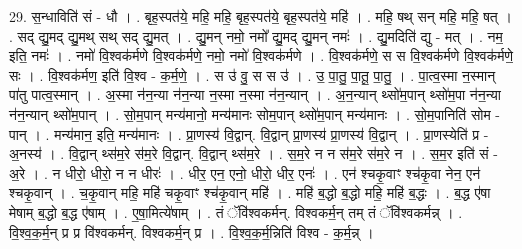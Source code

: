 \documentclass[17pt]{extarticle}
\begin{document}
29. स॒न्धाविति॑ सं - धौ । . बृह॒स्पत॑ये॒ महि॒ महि॒ बृह॒स्पत॑ये॒ बृह॒स्पत॑ये॒ महि॑ । . महि॒ षथ् सन् महि॒ महि॒ षत् । . सद् द्यु॒मद् द्यु॒मथ् सथ् सद् द्यु॒मत् । . द्यु॒मन् नमो॒ नमो᳚ द्यु॒मद् द्यु॒मन् नमः॑ । . द्यु॒मदिति॑ द्यु - मत् । . नम॒ इति॒ नमः॑ । . नमो॑ वि॒श्वक॑र्मणे वि॒श्वक॑र्मणे॒ नमो॒ नमो॑ वि॒श्वक॑र्मणे । . वि॒श्वक॑र्मणे॒ स स वि॒श्वक॑र्मणे वि॒श्वक॑र्मणे॒ सः । . वि॒श्वक॑र्मण॒ इति॑ वि॒श्व - क॒र्म॒णे॒ । . स उ॑ वु॒ स स उ॑ । . उ॒ पा॒तु॒ पा॒तू॒ पा॒तु॒ । . पा॒त्व॒स्मा न॒स्मान् पा॑तु पात्व॒स्मान् । . अ॒स्मा न॑न॒न्या न॑न॒न्या न॒स्मा न॒स्मा न॑न॒न्यान् । . अ॒न॒न्यान् थ्सो॑म॒पान् थ्सो॑म॒पा न॑न॒न्या न॑न॒न्यान् थ्सो॑म॒पान् । . सो॒म॒पान् मन्य॑मानो॒ मन्य॑मानः सोम॒पान् थ्सो॑म॒पान् मन्य॑मानः । . सो॒म॒पानिति॑ सोम - पान् । . मन्य॑मान॒ इति॒ मन्य॑मानः । . प्रा॒णस्य॑ वि॒द्वान्. वि॒द्वान् प्रा॒णस्य॑ प्रा॒णस्य॑ वि॒द्वान् । . प्रा॒णस्येति॑ प्र - अ॒नस्य॑ । . वि॒द्वान् थ्स॑म॒रे स॑म॒रे वि॒द्वान्. वि॒द्वान् थ्स॑म॒रे । . स॒म॒रे न न स॑म॒रे स॑म॒रे न । . स॒म॒र इति॑ सं - अ॒रे । . न धीरो॒ धीरो॒ न न धीरः॑ । . धीर॒ एन॒ एनो॒ धीरो॒ धीर॒ एनः॑ । . एन॑ श्चकृ॒वाꣳ श्च॑कृ॒वा नेन॒ एन॑ श्चकृ॒वान् । . च॒कृ॒वान् महि॒ महि॑ चकृ॒वाꣳ श्च॑कृ॒वान् महि॑ । . महि॑ ब॒द्धो ब॒द्धो महि॒ महि॑ ब॒द्धः । . ब॒द्ध ए॑षा मेषाम् ब॒द्धो ब॒द्ध ए॑षाम् । . ए॒षा॒मित्ये॑षाम् । . तं ॅवि॑श्वकर्मन्. विश्वकर्म॒न् तम् तं ॅवि॑श्वकर्मन्न् । . वि॒श्व॒क॒र्म॒न् प्र प्र वि॑श्वकर्मन्. विश्वकर्म॒न् प्र । . वि॒श्व॒क॒र्म॒न्निति॑ विश्व - क॒र्म॒न्न् । \newline
\end{document}
